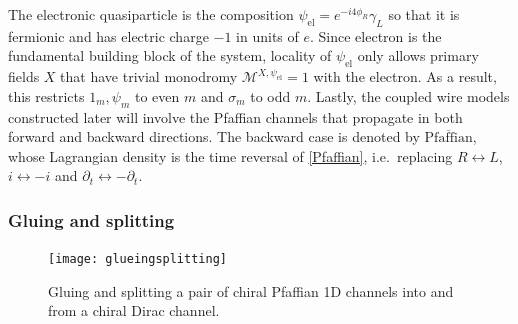 The electronic quasiparticle is the composition $\psi_{\mathrm{el}}=e^{-i4\phi_R}\gamma_L$ so that it is fermionic and has electric charge $-1$ in units of $e$. Since electron is the fundamental building block of the system, locality of $\psi_{\mathrm{el}}$ only allows primary fields $X$ that have trivial monodromy $\mathcal{M}^{X,\psi_{\mathrm{el}}}=1$ with the electron. As a result, this restricts $1_m,\psi_m$ to even $m$ and $\sigma_m$ to odd $m$. Lastly, the coupled wire models constructed later will involve the Pfaffian channels that propagate in both forward and backward directions. The backward case is denoted by $\overline{\mathrm{Pfaffian}}$, whose Lagrangian density is the time reversal of \eqref{Pfaffian}, i.e.~replacing $R\leftrightarrow L$, $i\leftrightarrow-i$ and $\partial_t\leftrightarrow-\partial_t$. 

\subsubsection{Gluing and splitting}\label{sec:gluing}

\begin{figure}[htbp]
	\centering\texttt{[image: glueingsplitting]}
	\caption{Gluing and splitting a pair of chiral Pfaffian 1D channels into and from a chiral Dirac channel.}\label{fig:glueingsplitting}
\end{figure}

